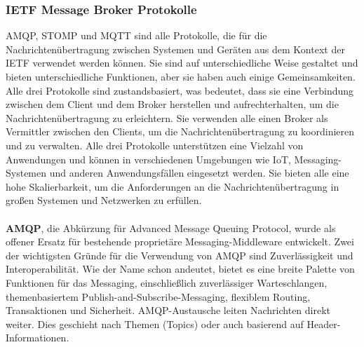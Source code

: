 \subsubsection{IETF Message Broker Protokolle}

AMQP, STOMP und MQTT sind alle Protokolle, die für die Nachrichtenübertragung zwischen Systemen und Geräten aus dem Kontext der IETF verwendet werden können. Sie sind auf unterschiedliche Weise gestaltet und bieten unterschiedliche Funktionen, aber sie haben auch einige Gemeinsamkeiten. Alle drei Protokolle sind zustandsbasiert, was bedeutet, dass sie eine Verbindung zwischen dem Client und dem Broker herstellen und aufrechterhalten, um die Nachrichtenübertragung zu erleichtern. Sie verwenden alle einen Broker als Vermittler zwischen den Clients, um die Nachrichtenübertragung zu koordinieren und zu verwalten.
Alle drei Protokolle unterstützen eine Vielzahl von Anwendungen und können in verschiedenen Umgebungen wie IoT, Messaging-Systemen und anderen Anwendungsfällen eingesetzt werden.
Sie bieten alle eine hohe Skalierbarkeit, um die Anforderungen an die Nachrichtenübertragung in großen Systemen und Netzwerken zu erfüllen. 
\\\\
\textbf{AMQP}, die Abkürzung für Advanced Message Queuing Protocol, wurde als offener Ersatz für bestehende proprietäre Messaging-Middleware entwickelt. Zwei der wichtigsten Gründe für die Verwendung von AMQP sind Zuverlässigkeit und Interoperabilität. Wie der Name schon andeutet, bietet es eine breite Palette von Funktionen für das Messaging, einschließlich zuverlässiger Warteschlangen, themenbasiertem Publish-and-Subscribe-Messaging, flexiblem Routing, Transaktionen und Sicherheit. AMQP-Austausche leiten Nachrichten direkt weiter. Dies geschieht nach Themen (Topics) oder auch basierend auf Header-Informationen.

